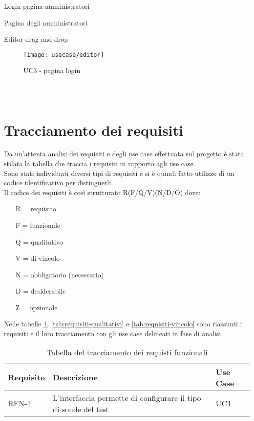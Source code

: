 \begin{usecase}{1}{Login pagina amministratori}
\begin{usecase}{2}{Pagina degli amministratori}
\begin{usecase}{3}{Editor drag-and-drop}
	\begin{figure}[!h] 
		\centering 
		\texttt{[image: usecase/editor]} 
		\caption{UC3 - pagina login}
	\end{figure}
	\\ 
	\\

\newpage
\section{Tracciamento dei requisiti}

Da un'attenta analisi dei requisiti e degli use case effettuata sul progetto è stata stilata la tabella che traccia i requisiti in rapporto agli use case.\\
Sono stati individuati diversi tipi di requisiti e si è quindi fatto utilizzo di un codice identificativo per distinguerli.\\
Il codice dei requisiti è così strutturato R(F/Q/V)(N/D/O) dove:
\begin{enumerate}
	\item[R =] requisito
    \item[F =] funzionale
    \item[Q =] qualitativo
    \item[V =] di vincolo
    \item[N =] obbligatorio (necessario)
    \item[D =] desiderabile
    \item[Z =] opzionale
\end{enumerate}
Nelle tabelle \ref{tab:requisiti-funzionali}, \ref{tab:requisiti-qualitativi} e \ref{tab:requisiti-vincolo} sono riassunti i requisiti e il loro tracciamento con gli use case delineati in fase di analisi.

\newpage

\begin{table}%
\caption{Tabella del tracciamento dei requisti funzionali}
\label{tab:requisiti-funzionali}
\begin{tabularx}{\textwidth}{lXl}
\hline\hline
\textbf{Requisito} & \textbf{Descrizione} & \textbf{Use Case}\\
\hline
RFN-1     & L'interfaccia permette di configurare il tipo di sonde del test & UC1 \\
\hline
\end{tabularx}
\end{table}%


\end{usecase}
\end{usecase}
\end{usecase}
